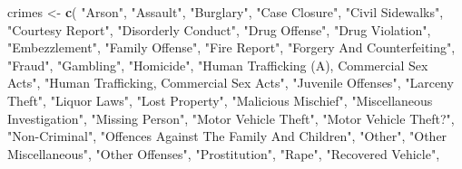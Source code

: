 \documentclass[
  12pt,
]{book}
\newenvironment{Shaded}{\begin{snugshade}}{\end{snugshade}}
\newcommand{\KeywordTok}[1]{\textcolor[rgb]{0.13,0.29,0.53}{\textbf{#1}}}
\newcommand{\NormalTok}[1]{#1}
\newcommand{\StringTok}[1]{\textcolor[rgb]{0.31,0.60,0.02}{#1}}
\begin{document}
\begin{Shaded}
\begin{Highlighting}[]
\NormalTok{crimes <{-}}\StringTok{ }\KeywordTok{c}\NormalTok{(}
  \StringTok{"Arson"}\NormalTok{,}
  \StringTok{"Assault"}\NormalTok{,                                  }
  \StringTok{"Burglary"}\NormalTok{,                                 }
  \StringTok{"Case Closure"}\NormalTok{,                             }
  \StringTok{"Civil Sidewalks"}\NormalTok{,                          }
  \StringTok{"Courtesy Report"}\NormalTok{,                          }
  \StringTok{"Disorderly Conduct"}\NormalTok{,                       }
  \StringTok{"Drug Offense"}\NormalTok{,                             }
  \StringTok{"Drug Violation"}\NormalTok{,                           }
  \StringTok{"Embezzlement"}\NormalTok{,                             }
  \StringTok{"Family Offense"}\NormalTok{,                           }
  \StringTok{"Fire Report"}\NormalTok{,                              }
  \StringTok{"Forgery And Counterfeiting"}\NormalTok{,               }
  \StringTok{"Fraud"}\NormalTok{,                                    }
  \StringTok{"Gambling"}\NormalTok{,                                 }
  \StringTok{"Homicide"}\NormalTok{,                                 }
  \StringTok{"Human Trafficking (A), Commercial Sex Acts"}\NormalTok{,}
  \StringTok{"Human Trafficking, Commercial Sex Acts"}\NormalTok{,   }
  \StringTok{"Juvenile Offenses"}\NormalTok{,                        }
  \StringTok{"Larceny Theft"}\NormalTok{,                            }
  \StringTok{"Liquor Laws"}\NormalTok{,                              }
  \StringTok{"Lost Property"}\NormalTok{,                            }
  \StringTok{"Malicious Mischief"}\NormalTok{,                       }
  \StringTok{"Miscellaneous Investigation"}\NormalTok{,              }
  \StringTok{"Missing Person"}\NormalTok{,                           }
  \StringTok{"Motor Vehicle Theft"}\NormalTok{,                      }
  \StringTok{"Motor Vehicle Theft?"}\NormalTok{,                     }
  \StringTok{"Non{-}Criminal"}\NormalTok{,                             }
  \StringTok{"Offences Against The Family And Children"}\NormalTok{, }
  \StringTok{"Other"}\NormalTok{,                                    }
  \StringTok{"Other Miscellaneous"}\NormalTok{,                      }
  \StringTok{"Other Offenses"}\NormalTok{,                           }
  \StringTok{"Prostitution"}\NormalTok{,                             }
  \StringTok{"Rape"}\NormalTok{,                                     }
  \StringTok{"Recovered Vehicle"}\NormalTok{,                        }

\end{Highlighting}
\end{Shaded}
\end{document}
